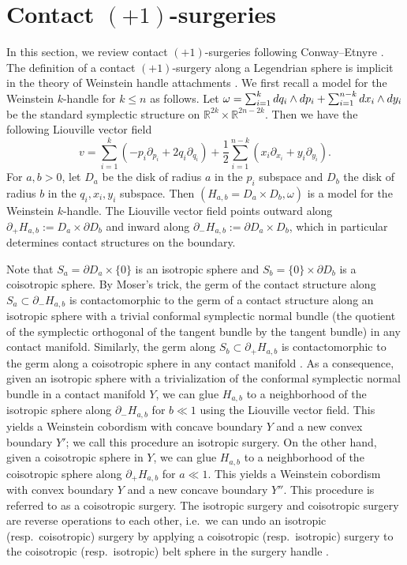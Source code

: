\documentclass[reqno,11pt]{amsart}
\numberwithin{equation}{section}
\def\R{\mathbb{R}}
\def\rd{{\rm d}}
\begin{document}
\section{Contact $(+1)$-surgeries}
In this section, we review contact $(+1)$-surgeries following Conway--Etnyre \cite{zbMATH07206659}. The definition of a contact $(+1)$-surgery along a Legendrian sphere is implicit in the theory of Weinstein handle attachments \cite{zbMATH06054083,zbMATH04147116,zbMATH00011093}. We first recall a model for the Weinstein $k$-handle for $k\le n$ as follows. Let $\omega = \sum_{i=1}^k\rd q_i\wedge \rd p_i + \sum_{i=1}^{n-k}\rd x_i\wedge \rd y_i$ be the standard symplectic structure on $\R^{2k}\times \R^{2n-2k}$. Then we have the following Liouville vector field 
$$v=\sum_{i=1}^k(-p_i\partial_{p_i}+2q_i\partial_{q_i})+\frac{1}{2}\sum_{i=1}^{n-k}(x_i\partial_{x_i}+y_i\partial_{y_i}).$$
For $a,b>0$, let $D_a$ be the disk of radius $a$ in the $p_i$ subspace and $D_b$ the disk of radius $b$ in the $q_i,x_i,y_i$ subspace. Then $(H_{a,b}=D_a\times D_b,\omega)$ is a model for the Weinstein $k$-handle. The Liouville vector field points outward along $\partial_+H_{a,b}:=D_a\times \partial D_b$ and inward along $\partial_-H_{a,b}:=\partial D_a \times D_b$, which in particular determines contact structures on the boundary.

Note that $S_a=\partial D_a \times \{0\}$ is an isotropic sphere and $S_b=\{0\} \times \partial D_b$ is a coisotropic sphere. By Moser's trick, the germ of the contact structure along $S_a\subset \partial_-H_{a,b}$ is contactomorphic to the germ of a contact structure along an isotropic sphere with a trivial conformal symplectic normal bundle (the quotient of the symplectic orthogonal of the tangent bundle by the tangent bundle) in any contact manifold. Similarly, the germ along $S_b\subset \partial_+H_{a,b}$ is contactomorphic to the germ along a coisotropic sphere in any contact manifold \cite[Lemma 3.4]{zbMATH07206659}. As a consequence, given an isotropic sphere with a trivialization of the conformal symplectic normal bundle in a contact manifold $Y$, we can glue $H_{a,b}$ to a neighborhood of the isotropic sphere along $\partial_-H_{a,b}$ for $b\ll 1$ using the Liouville vector field. This yields a Weinstein cobordism with concave boundary $Y$ and a new convex boundary $Y'$; we call this procedure an isotropic surgery. On the other hand, given a coisotropic sphere in $Y$, we can glue $H_{a,b}$ to a neighborhood of the coisotropic sphere along $\partial_+H_{a,b}$ for $a\ll 1$. This yields a Weinstein cobordism with convex boundary $Y$ and a new concave boundary $Y''$. This procedure is referred to as a coisotropic surgery. The isotropic surgery and coisotropic surgery are reverse operations to each other, i.e.\ we can undo an isotropic (resp.\ coisotropic) surgery by applying a coisotropic (resp.\ isotropic) surgery to the coisotropic (resp.\ isotropic) belt sphere in the surgery handle \cite[Lemma 3.9, Proposition 3.10]{zbMATH07206659}. 
\end{document}
